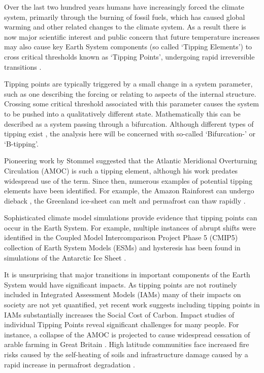 Over the last two hundred years humans have increasingly forced the climate system, 
primarily through the burning of fossil fuels,
which has caused global warming and other related changes to the climate
system. As a result there is now major scientific interest and public 
concern \parencite{Lenton2019a,Steffen2018,Ritchie2021} that future 
temperature increases may also cause key
Earth System components (so called `Tipping Elements')  to cross 
critical thresholds known as `Tipping Points', undergoing rapid 
irreversible transitions \parencite{Lenton2008}. 

Tipping points are typically triggered by a small change in a system parameter, such as one describing the forcing or
relating to aspects of the internal structure. Crossing some critical threshold associated with this parameter causes the system to be pushed into a qualitatively 
different state. Mathematically this can be described as a system passing through a bifurcation. 
Although different types of tipping exist \parencite{Ashwin2012}, the analysis here 
will be concerned with so-called `Bifurcation-' or `B-tipping'.


Pioneering work by Stommel suggested that the Atlantic Meridional Overturning 
Circulation (AMOC) \parencite{STOMMEL1961} is such a tipping element, although
his work predates widespread use of the term. Since then,
numerous examples of potential tipping elements have been identified.
For example, the Amazon Rainforest can undergo dieback \parencite{Cox2000}, the 
Greenland ice-sheet can melt \parencite{Feldmann2015} and
permafrost can thaw rapidly \parencite{Steffen2018}.

Sophisticated climate model simulations \parencite{Rahmstorf1995} provide evidence that tipping points can occur
in the Earth System. For example, multiple
instances of abrupt shifts were identified in the Coupled Model Intercomparison Project Phase 5 (CMIP5) \parencite{Taylor2012}
collection of Earth System Models (ESMs) \parencite{Drijfhout2015} and hysteresis has been found in 
simulations of the Antarctic Ice Sheet \parencite{Garbe2020}. 

It is unsurprising that major transitions in important components
of the Earth System would have significant impacts. As tipping points
are not routinely included in Integrated Assessment Models (IAMs) many of 
their impacts on society are not yet quantified, yet recent 
work \parencite{Dietz2021}
suggests including tipping points in IAMs
substantially increases the Social Cost 
of Carbon. Impact studies of individual 
Tipping Points reveal significant challenges for many people. For instance, a 
collapse of the AMOC is projected to cause
widespread cessation of arable farming in Great Britain \parencite{Ritchie2020a}.
High latitude communities face increased fire risks caused 
by the self-heating of soils \parencite{Clarke2021} and infrastructure damage 
caused by a rapid increase in permafrost degradation \parencite{Teufel2019}. 


